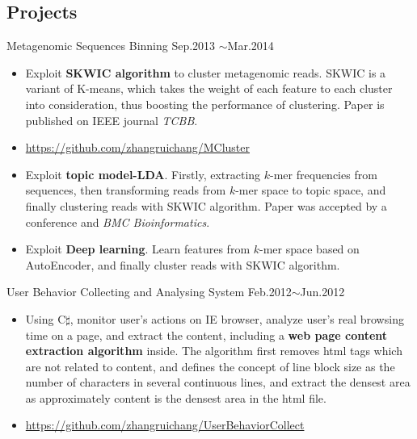 \documentclass[margin]{res}
\begin{document}
\begin{resume}
\section{Projects}
Metagenomic Sequences Binning \hfill Sep.2013 $\sim$Mar.2014
\begin{spacing}{0.02}
\end{spacing}
\begin{itemize}
\item Exploit \textbf{SKWIC algorithm} to cluster metagenomic reads. SKWIC is a variant of K-means, which takes the weight of each feature to each cluster into consideration, thus boosting the performance of clustering. Paper is published on IEEE journal \emph{TCBB}.
\item \url{https://github.com/zhangruichang/MCluster}
\item Exploit \textbf{topic model-LDA}. Firstly, extracting $k$-mer frequencies from sequences, then transforming reads from $k$-mer space to topic space, and finally clustering reads with SKWIC algorithm. Paper was accepted by a conference and \emph{BMC Bioinformatics}.
\item Exploit \textbf{Deep learning}. Learn features from $k$-mer space based on AutoEncoder, and finally cluster reads with SKWIC algorithm.
\end{itemize}
User Behavior Collecting and Analysing System \hfill Feb.2012$\sim$Jun.2012
\begin{spacing}{0.1}
\end{spacing}
\begin{itemize}
\item Using C$\sharp$, monitor user's actions on IE browser, analyze user's real browsing time on a page, and extract the content, including a \textbf{web page content extraction algorithm} inside. The algorithm first removes html tags which are not related to content, and defines the concept of line block size as the number of characters in several continuous lines, and extract the densest area as approximately content is the densest area in the html file.
\item \url{https://github.com/zhangruichang/UserBehaviorCollect}
\end{itemize}



\end{resume}
\end{document}
